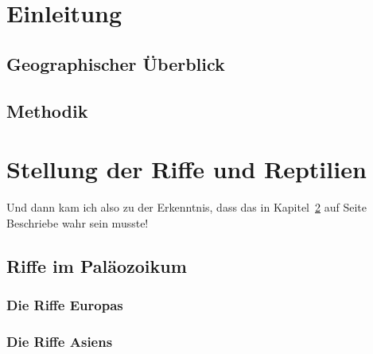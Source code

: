\documentclass[a4paper,DIV=calc,11pt,%
BCOR=3mm,twoside,headsepline,%
openright,%
numbers=noenddot,%
bibliography=totoc%
]{scrreprt}
\begin{document}
\newpage

\begin{abstract} %

\blindtext

\end{abstract}

\tableofcontents

\chapter{Einleitung}

\blindtext

\section{Geographischer Überblick}

\blindtext

\section{Methodik}

\blindtext

\chapter{Stellung der Riffe und Reptilien}
\label{StellungRiff}

Und dann kam ich also zu der Erkenntnis, dass das in Kapitel~\ref{StellungRiff} auf Seite \pageref{StellungRiff} Beschriebe wahr sein musste!

\section{Riffe im Paläozoikum}

\subsection{Die Riffe Europas}

\blindtext

\subsection{Die Riffe Asiens}
\end{document}
